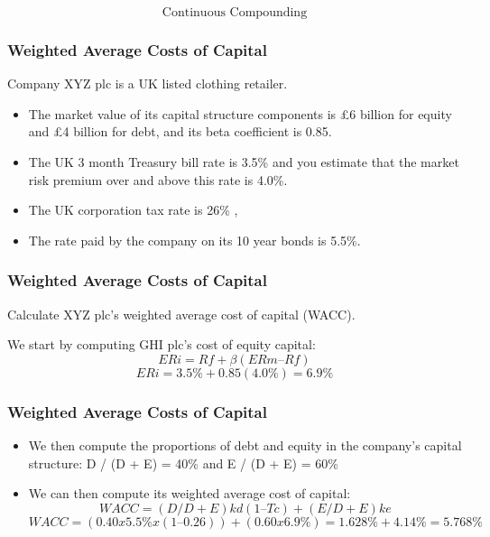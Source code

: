 \documentclass{beamer}
\begin{document}
\begin{frame}
\Large
\[
\mbox{Continuous Compounding}
\]
\end{frame}

\begin{frame}
\frametitle{Weighted Average Costs of Capital}
\Large
Company XYZ  plc is a UK listed clothing retailer. 

\begin{itemize}
\item The market value of its capital
structure components is £6 billion for equity and £4 billion for debt, and its beta
coefficient is 0.85. \item The UK 3 month Treasury bill rate is 3.5\% and you estimate that
the market risk premium over and above this rate is 4.0\%. 
\item The UK corporation tax rate is 26\% ,
\item The rate paid by the company on its 10 year bonds is 5.5\%.
\end{itemize}

\end{frame}

\begin{frame}
\frametitle{Weighted Average Costs of Capital}
\Large
Calculate  XYZ plc’s weighted average cost of capital (WACC).

We start by computing GHI plc’s cost of equity capital:
\[ERi = Rf + β (ERm – Rf)\]
\[ERi = 3.5\% + 0.85 (4.0\%) = 6.9\%\]
\end{frame}

\begin{frame}
\frametitle{Weighted Average Costs of Capital}
\Large
\begin{itemize}
\item We then compute the proportions of debt and equity in the company’s capital
structure:
D / (D + E) = 40\% and E / (D + E) = 60\%
\item We can then compute its weighted average cost of capital:
\[WACC = (D / D+E) kd (1 – Tc) + (E / D + E) ke\]
\[WACC = (0.40 x 5.5\% x (1 – 0.26)) + (0.60 x 6.9\%) = 1.628\% + 4.14\% = 5.768\%\]
\end{itemize}

\end{frame}
\end{document}
